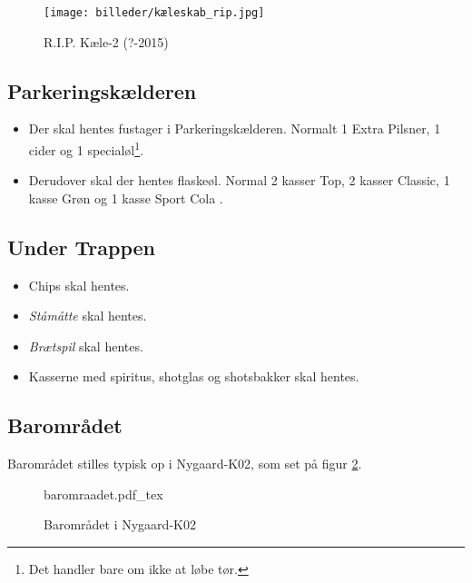 \begin{figure}[H]
	\centering
	\texttt{[image: billeder/kæleskab\_rip.jpg]}
	\caption{R.I.P. Kæle-2 (?-2015)}
	\label{fig:køleskab-rip}
\end{figure}

\subsection{Parkeringskælderen}
\label{sec:pre:hopper}

\begin{itemize}
	\item Der skal hentes fustager i Parkeringskælderen. Normalt 1
	Extra Pilsner, 1 cider og 1 specialøl\footnote[1]{\label{note1}Det handler bare om ikke at løbe
	tør.}.
	\item Derudover skal der hentes flaskeøl. Normal 2 kasser Top, 2 kasser Classic, 
	1 kasse Grøn og 1 kasse Sport Cola \footnotemark[1].
\end{itemize}

\subsection{Under Trappen}
\label{sec:pre:under-trappen}

\begin{itemize}
	\item Chips skal hentes.
	\item \textit{Ståmåtte} skal hentes.
	\item \textit{Brætspil} skal hentes.
	\item Kasserne med spiritus, shotglas og shotsbakker skal hentes.
\end{itemize}

\subsection{Barområdet}
\label{sec:pre:baromradet}

Barområdet stilles typisk op i Nygaard-K02, som set på figur \ref{fig:baromraadet}.

\begin{figure}[H]
	\centering
	\def\svgwidth{\columnwidth}
	{\small{baromraadet.pdf_tex}}
	\caption{Barområdet i Nygaard-K02}
	\label{fig:baromraadet}
\end{figure}

